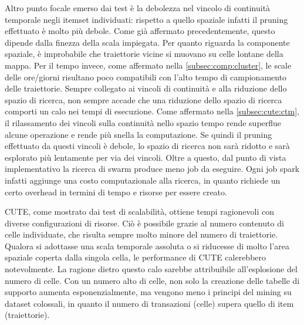 Altro punto focale emerso dai test è la debolezza nel vincolo di continuità temporale negli itemset individuati: rispetto a quello spaziale infatti il pruning effettuato è molto più debole.
Come già affermato precedentemente, questo dipende dalla finezza della scala impiegata.
Per quanto riguarda la componente spaziale, è improbabile che traiettorie vicine si muovano su celle lontane della mappa.
Per il tempo invece, come affermato nella \cref{subsec:comp:cluster}, le scale delle ore/giorni risultano poco compatibili con l'alto tempo di campionamento delle traiettorie.
Sempre collegato ai vincoli di continuità e alla riduzione dello spazio di ricerca, non sempre accade che una riduzione dello spazio di ricerca comporti un calo nei tempi di esecuzione.
Come affermato nella \cref{subsec:cute:ctm}, il rilassamento dei vincoli sulla continuità nello spazio tempo rende superflue alcune operazione e rende più snella la computazione.
Se quindi il pruning effettuato da questi vincoli è debole, lo spazio di ricerca non sarà ridotto e sarà esplorato più lentamente per via dei vincoli.
Oltre a questo, dal punto di vista implementativo la ricerca di swarm produce meno job da eseguire.
Ogni job spark infatti aggiunge una costo computazionale alla ricerca, in quanto richiede un certo overhead in termini di tempo e risorse per essere creato.

CUTE, come mostrato dai test di scalabilità, ottiene tempi ragionevoli con diverse configurazioni di risorse.
Ciò è possibile grazie al numero contenuto di celle individuate, che risulta sempre molto minore del numero di traiettorie.
Qualora si adottasse una scala temporale assoluta o si riducesse di molto l'area spaziale coperta dalla singola cella, le performance di CUTE calerebbero notevolmente.
La ragione dietro questo calo sarebbe attribuibile all'esplosione del numero di celle.
Con un numero alto di celle, non solo la creazione delle tabelle di supporto aumenta esponenzialmente, ma vengono meno i principi del mining su dataset colossali, in quanto il numero di transazioni (celle) supera quello di item (traiettorie).